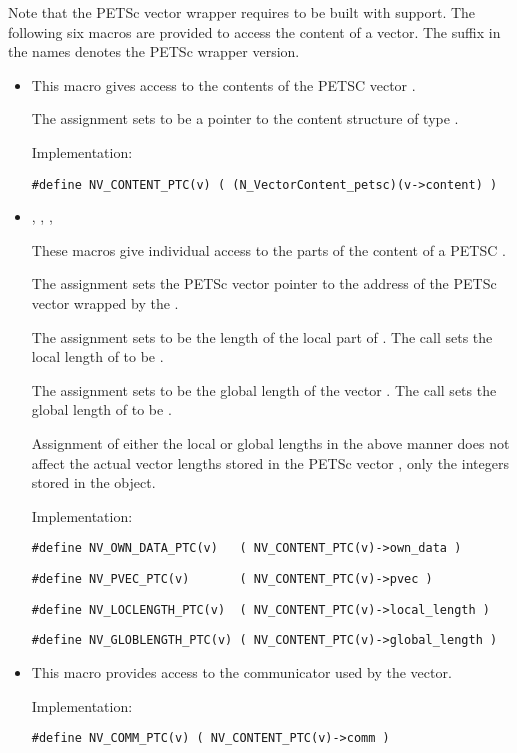 Note that the PETSc vector wrapper requires {\sundials} to be built with {\mpi} support.
The following six macros are provided to access the content of a {\nvecpetsc}
vector. The suffix  in the names denotes the PETSc wrapper 
version.
\begin{itemize}

\item 

  This macro gives access to the contents of the PETSC
  vector .
  
  The assignment  sets       
   to be a pointer to the  content    
  structure of type .
  
  Implementation:
  
  \verb|#define NV_CONTENT_PTC(v) ( (N_VectorContent_petsc)(v->content) )|
  
\item 
  , , 
  , 
  
  These macros give individual access to the parts of    
  the content of a PETSC .                        
  
  The assignment  sets the PETSc vector
  pointer  to the address of the PETSc vector wrapped by
  the  .
  
  The assignment  sets  to be     
  the length of the local part of . 
  The call  sets      
  the local length of  to be .
  
  The assignment  sets  to  
  be the global length of the vector .                    
  The call  sets the global       
  length of  to be .
  
  {\warn}Assignment of either the local or global lengths in the above
  manner does not affect the actual vector lengths stored in the PETSc
  vector , only the integers stored in the {\nvecpetsc} object.
  
  Implementation:
  
  \verb|#define NV_OWN_DATA_PTC(v)   ( NV_CONTENT_PTC(v)->own_data )|

  \verb|#define NV_PVEC_PTC(v)       ( NV_CONTENT_PTC(v)->pvec )|

  \verb|#define NV_LOCLENGTH_PTC(v)  ( NV_CONTENT_PTC(v)->local_length )|

  \verb|#define NV_GLOBLENGTH_PTC(v) ( NV_CONTENT_PTC(v)->global_length )|
  
\item {}

  This macro provides access to the {\mpi} communicator used by the {\nvecpetsc}
  vector.

  Implementation:

  \verb|#define NV_COMM_PTC(v) ( NV_CONTENT_PTC(v)->comm )|

\end{itemize}
